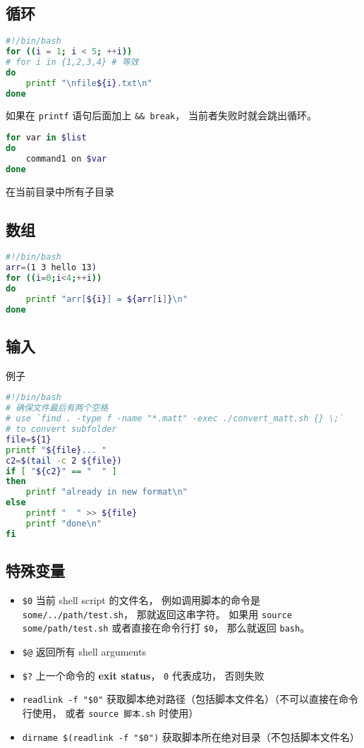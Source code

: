 \subsection{循环}
\begin{lstlisting}[language=bash]
#!/bin/bash
for ((i = 1; i < 5; ++i))
# for i in {1,2,3,4} # 等效
do
	printf "\nfile${i}.txt\n"
done
\end{lstlisting}
如果在 \verb|printf| 语句后面加上 \verb|&& break|， 当前者失败时就会跳出循环。

\begin{lstlisting}[language=bash]
for var in $list
do
    command1 on $var
done
\end{lstlisting}

在当前目录中所有子目录

\subsection{数组}
\begin{lstlisting}[language=bash]
#!/bin/bash
arr=(1 3 hello 13)
for ((i=0;i<4;++i))
do
    printf "arr[${i}] = ${arr[i]}\n"
done
\end{lstlisting}


\subsection{输入}
例子
\begin{lstlisting}[language=bash]
#!/bin/bash
# 确保文件最后有两个空格
# use `find . -type f -name "*.matt" -exec ./convert_matt.sh {} \;`
# to convert subfolder
file=${1}
printf "${file}... "
c2=$(tail -c 2 ${file})
if [ "${c2}" == "  " ]
then
	printf "already in new format\n"
else
	printf "  " >> ${file}
	printf "done\n"
fi
\end{lstlisting}

\subsection{特殊变量}
\begin{itemize}
\item \verb`$0` 当前 shell script 的文件名， 例如调用脚本的命令是 \verb|some/../path/test.sh|， 那就返回这串字符。 如果用 \verb|source some/path/test.sh| 或者直接在命令行打 \verb|$0|， 那么就返回 \verb|bash|。
\item \verb`$@` 返回所有 shell arguments
\item \verb|$?| 上一个命令的 \textbf{exit status}， \verb|0| 代表成功， 否则失败
\item \verb|readlink -f "$0"| 获取脚本绝对路径（包括脚本文件名）（不可以直接在命令行使用， 或者 \verb|source 脚本.sh| 时使用）
\item \verb|dirname $(readlink -f "$0")| 获取脚本所在绝对目录（不包括脚本文件名）
\end{itemize}


